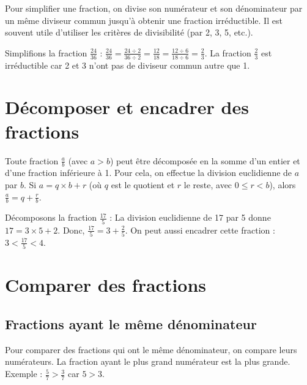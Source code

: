 \begin{methodebox}
  Pour simplifier une fraction, on divise son numérateur et son dénominateur par un même diviseur commun jusqu'à obtenir une fraction irréductible.
  Il est souvent utile d'utiliser les critères de divisibilité (par 2, 3, 5, etc.).
\end{methodebox}

\begin{examplebox}[Simplification]
  Simplifions la fraction $\frac{24}{36}$ :
  $\frac{24}{36} = \frac{24 \div 2}{36 \div 2} = \frac{12}{18} = \frac{12 \div 6}{18 \div 6} = \frac{2}{3}$.
  La fraction $\frac{2}{3}$ est irréductible car 2 et 3 n'ont pas de diviseur commun autre que 1.
\end{examplebox}

\section{Décomposer et encadrer des fractions}

\begin{proprietebox}
  Toute fraction $\frac{a}{b}$ (avec $a > b$) peut être décomposée en la somme d'un entier et d'une fraction inférieure à 1. Pour cela, on effectue la division euclidienne de $a$ par $b$.
  Si $a = q \times b + r$ (où $q$ est le quotient et $r$ le reste, avec $0 \le r < b$), alors $\frac{a}{b} = q + \frac{r}{b}$.
\end{proprietebox}

\begin{examplebox}[Décomposition]
  Décomposons la fraction $\frac{17}{5}$ :
  La division euclidienne de 17 par 5 donne $17 = 3 \times 5 + 2$.
  Donc, $\frac{17}{5} = 3 + \frac{2}{5}$.
  On peut aussi encadrer cette fraction : $3 < \frac{17}{5} < 4$.
\end{examplebox}

\section{Comparer des fractions}

\subsection{Fractions ayant le même dénominateur}
\begin{proprietebox}
  Pour comparer des fractions qui ont le même dénominateur, on compare leurs numérateurs. La fraction ayant le plus grand numérateur est la plus grande.
  Exemple : $\frac{5}{7} > \frac{3}{7}$ car $5 > 3$.
\end{proprietebox}

